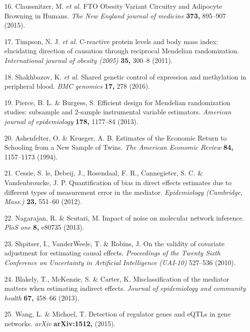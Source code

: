 \documentclass[]{article}
\begin{document}
\hypertarget{ref-Claussnitzer2015}{}
16. Claussnitzer, M. \emph{et al.} FTO Obesity Variant Circuitry and
Adipocyte Browning in Humans. \emph{The New England journal of medicine}
\textbf{373,} 895--907 (2015).

\hypertarget{ref-Timpson2011}{}
17. Timpson, N. J. \emph{et al.} C-reactive protein levels and body mass
index: elucidating direction of causation through reciprocal Mendelian
randomization. \emph{International journal of obesity (2005)}
\textbf{35,} 300--8 (2011).

\hypertarget{ref-Shakhbazov2016}{}
18. Shakhbazov, K. \emph{et al.} Shared genetic control of expression
and methylation in peripheral blood. \emph{BMC genomics} \textbf{17,}
278 (2016).

\hypertarget{ref-Pierce2013}{}
19. Pierce, B. L. \& Burgess, S. Efficient design for Mendelian
randomization studies: subsample and 2-sample instrumental variable
estimators. \emph{American journal of epidemiology} \textbf{178,}
1177--84 (2013).

\hypertarget{ref-Ashenfelter1994}{}
20. Ashenfelter, O. \& Krueger, A. B. Estimates of the Economic Return
to Schooling from a New Sample of Twins. \emph{The American Economic
Review} \textbf{84,} 1157--1173 (1994).

\hypertarget{ref-LeCessie2012}{}
21. Cessie, S. le, Debeij, J., Rosendaal, F. R., Cannegieter, S. C. \&
Vandenbroucke, J. P. Quantification of bias in direct effects estimates
due to different types of measurement error in the mediator.
\emph{Epidemiology (Cambridge, Mass.)} \textbf{23,} 551--60 (2012).

\hypertarget{ref-Nagarajan2013}{}
22. Nagarajan, R. \& Scutari, M. Impact of noise on molecular network
inference. \emph{PloS one} \textbf{8,} e80735 (2013).

\hypertarget{ref-Shpitser2010}{}
23. Shpitser, I., VanderWeele, T. \& Robins, J. On the validity of
covariate adjustment for estimating causal effects. \emph{Proceedings of
the Twenty Sixth Conference on Uncertainty in Artificial Intelligence
(UAI-10)} 527--536 (2010).

\hypertarget{ref-Blakely2013}{}
24. Blakely, T., McKenzie, S. \& Carter, K. Misclassification of the
mediator matters when estimating indirect effects. \emph{Journal of
epidemiology and community health} \textbf{67,} 458--66 (2013).

\hypertarget{ref-Wang2015}{}
25. Wang, L. \& Michoel, T. Detection of regulator genes and eQTLs in
gene networks. \emph{arXiv} \textbf{arXiv:1512,} (2015).
\end{document}
